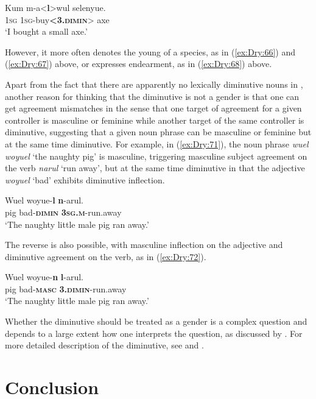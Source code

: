 \documentclass[output=collectionpaper]{langsci/langscibook}
\begin{document}
\ea \label{ex:Dry:69}
\gll Kum	m-a<\textbf{l}>wul	selenyue.\\
\textsc{1sg} \textsc{1sg}-buy\textbf{<\textsc{3.dimin}}> axe\\
\glt `I bought a small axe.'
\z

However, it more often denotes the young of a species, as in (\ref{ex:Dry:66}) and (\ref{ex:Dry:67}) above, or expresses endearment, as in (\ref{ex:Dry:68}) above.

Apart from the fact that there are apparently no lexically diminutive nouns in , another reason for thinking that the  diminutive is not a gender is that one can get agreement mismatches in the sense that one target of agreement for a given controller is masculine or feminine while another target of the same controller is diminutive, suggesting that a given noun phrase can be masculine or feminine but at the same time diminutive. For example, in (\ref{ex:Dry:71}), the noun phrase \textit{wuel woyuel} `the naughty pig' is masculine, triggering masculine subject agreement on the verb \textit{narul} `run away', but at the same time diminutive in that the adjective \textit{woyuel} `bad' exhibits diminutive inflection.

\ea \label{ex:Dry:71}
\gll Wuel	woyue-\textbf{l}	\textbf{n}-arul.\\
pig bad-\textbf{\textsc{dimin}} \textbf{\textsc{3sg.m}}-run.away\\
\glt `The naughty little male pig ran away.'
\z

The reverse is also possible, with masculine inflection on the adjective and diminutive agreement on the verb, as in (\ref{ex:Dry:72}).

\ea \label{ex:Dry:72}
\gll Wuel	woyue-\textbf{n}	\textbf{l}-arul.\\
pig bad-\textbf{\textsc{masc}} \textbf{\textsc{3.dimin}}-run.away\\
\glt `The naughty little male pig ran away.'
\z

Whether the  diminutive should be treated as a gender is a complex question and depends to a large extent how one interprets the question, as discussed by \citet{Dryer2016}. For more detailed description of the  diminutive, see \citet{DryerUnderrevision} and \citet{DryerInpreparation}.

\section{Conclusion}
\end{document}
